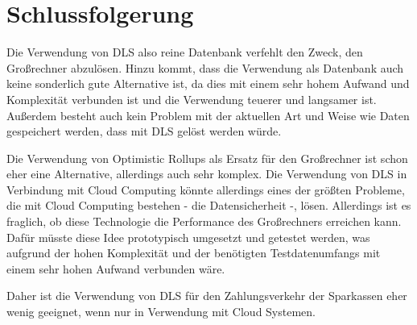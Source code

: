 \section{Schlussfolgerung}
\label{sec:Fazit}

Die Verwendung von DLS also reine Datenbank verfehlt den Zweck, den Großrechner abzulösen. 
Hinzu kommt, dass die Verwendung als Datenbank auch keine sonderlich gute Alternative ist, da dies mit einem sehr hohem Aufwand und Komplexität verbunden ist und die Verwendung teuerer und langsamer ist.
Außerdem besteht auch kein Problem mit der aktuellen Art und Weise wie Daten gespeichert werden, dass mit DLS gelöst werden würde.

\noindent
Die Verwendung von Optimistic Rollups als Ersatz für den Großrechner ist schon eher eine Alternative, allerdings auch sehr komplex.
Die Verwendung von DLS in Verbindung mit Cloud Computing könnte allerdings eines der größten Probleme, die mit Cloud Computing bestehen - die Datensicherheit -, lösen.
Allerdings ist es fraglich, ob diese Technologie die Performance des Großrechners erreichen kann.
Dafür müsste diese Idee prototypisch umgesetzt und getestet werden, was aufgrund der hohen Komplexität und der benötigten Testdatenumfangs mit einem sehr hohen Aufwand verbunden wäre.

\noindent
Daher ist die Verwendung von DLS für den Zahlungsverkehr der Sparkassen eher wenig geeignet, wenn nur in Verwendung mit Cloud Systemen.